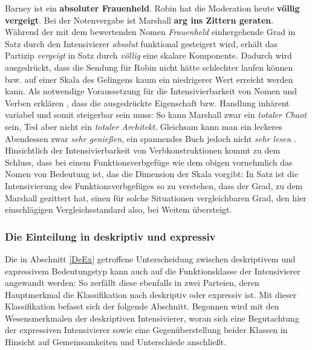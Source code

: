 \ea  \label{SynQuatsch}
\ea Barney ist ein \textbf{absoluter Frauenheld}.  \label{marsh1}
\ex Robin hat die Moderation heute \textbf{völlig vergeigt}. \label{marsh2}
\ex Bei der Notenvergabe ist Marshall \textbf{arg ins Zittern geraten}. \label{marsh3}
 \z
 \z
Während der mit dem bewertenden Nomen \textit{Frauenheld} einhergehende Grad in Satz  durch den Intensivierer \textit{absolut} funktional gesteigert wird, erhält das Partizip \textit{vergeigt} in Satz  durch \textit{völlig} eine skalare Komponente. Dadurch wird ausgedrückt, dass die Sendung für Robin nicht hätte schlechter laufen können bzw. auf einer Skala des Gelingens kaum ein niedrigerer Wert erreicht werden kann. Als notwendige Voraussetzung für die Intensivierbarkeit von Nomen und Verben erklären {\citet[292]{Hentschel.2013}}, dass die ausgedrückte Eigenschaft bzw. Handlung inhärent variabel und somit steigerbar sein muss: So kann Marshall zwar ein \textit{totaler Chaot} sein, Ted aber nicht ein \textit{totaler Architekt}. Gleichsam kann man ein leckeres Abendessen zwar \textit{sehr genießen}, ein spannendes Buch jedoch nicht \textit{sehr lesen} {\citep[vgl.][292]{Hentschel.2013}}. Hinsichtlich der Intensivierbarkeit von Verbkonstruktionen kommt \citet[21]{Laitenberger.2016} zu dem Schluss, dass bei einem Funktionsverbgefüge wie dem obigen vornehmlich das Nomen von Bedeutung ist, das die Dimension der Skala vorgibt: In Satz  ist die Intensivierung des Funktionsverbgefüges so zu verstehen, dass der Grad, zu dem Marshall gezittert hat, einen für solche Situationen vergleichbaren Grad, den hier einschlägigen Vergleichsstandard also, bei Weitem übersteigt.



\subsubsection{Die Einteilung in deskriptiv und expressiv} \label{Intensivierertypen}
Die in Abschnitt \ref{DeEx} getroffene Unterscheidung zwischen deskriptivem und expressivem Bedeutungstyp kann auch auf die Funktionsklasse der Intensivierer angewandt werden: So zerfällt diese ebenfalls in zwei Parteien, deren Hauptmerkmal die Klassifikation nach deskriptiv oder expressiv ist. Mit dieser Klassifikation befasst sich der folgende Abschnitt. Begonnen wird mit den Wesensmerkmalen der deskriptiven Intensivierer, woran sich eine Begutachtung der expressiven Intensivierer sowie eine Gegenüberstellung beider Klassen in Hinsicht auf Gemeinsamkeiten und Unterschiede anschließt.

